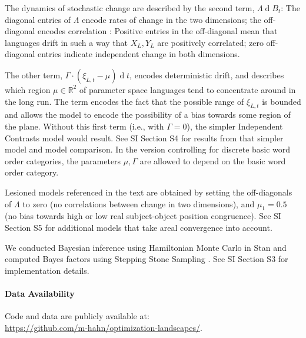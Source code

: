 \documentclass[11pt,a4paper]{article}
\begin{document}
The dynamics of stochastic change are described by the second term, $\Lambda \operatorname{d}B_t$:
The diagonal entries of $\Lambda$ encode rates of change in the two dimensions; the off-diagonal encodes correlation \citep{felsenstein1973maximum,freckleton2012fast}: Positive entries in the off-diagonal mean that languages drift in such a way that $X_L, Y_L$ are positively correlated; zero off-diagonal entries indicate independent change in both dimensions.



The other term, $\Gamma \cdot (\xi_{L,t}-\mu) \operatorname{d}t$, encodes deterministic drift, and describes which region $\mu \in \mathbb{R}^2$ of parameter space languages tend to concentrate around in the long run.
The term encodes the fact that the possible range of $\xi_{L,t}$ is bounded and allows the model to encode the possibility of a bias towards some region of the plane.
Without this first term (i.e., with $\Gamma =0$), the simpler Independent Contrasts model \citep{felsenstein1973maximum,freckleton2012fast} would result. See SI Section S4 for results from that simpler model and model comparison.
In the version controlling for discrete basic word order categories, the parameters $\mu, \Gamma$ are allowed to depend on the basic word order category.

Lesioned models referenced in the text are obtained by setting the off-diagonals of $\Lambda$ to zero (no correlations between change in two dimensions), and $\mu_1=0.5$ (no bias towards high or low real subject-object position congruence).
See SI Section S5 for additional models that take areal convergence into account.


We conducted Bayesian inference using Hamiltonian Monte Carlo in Stan \citep{homan2014the,carpenter2017stan} and computed Bayes factors using Stepping Stone Sampling \citep{xie2011improving}.
See SI Section S3 for implementation details.


\begin{sloppypar}\paragraph{Data Availability} Code and data are publicly available at:\\

\url{https://github.com/m-hahn/optimization-landscapes/}.\end{sloppypar}





\end{document}
